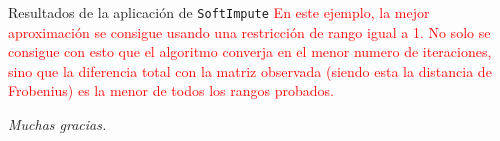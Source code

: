 \documentclass{beamer}
\begin{document}
\begin{frame}{Resultados de la aplicación de \texttt{SoftImpute}}
\vskip 0.3cm
\textcolor{red}{En este ejemplo, la mejor aproximación se consigue usando una restricción de rango igual a 1. No solo se consigue con esto que el algoritmo converja en el menor numero de iteraciones, sino que la diferencia total con la matriz observada (siendo esta la distancia de Frobenius) es la menor de todos los rangos probados.}
\end{frame}

    
\begin{frame}{}
  \centering \huge
  \emph{Muchas gracias.}
\end{frame}
\end{document}
